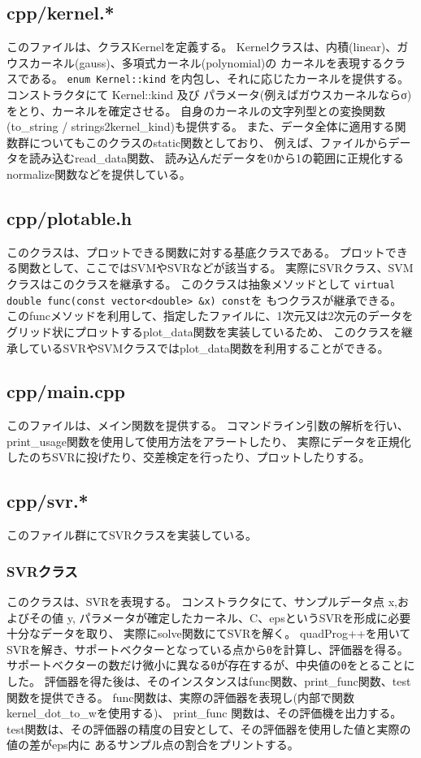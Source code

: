 \documentclass[]{jsarticle}
\begin{document}
\subsection{cpp/kernel.*}
このファイルは、クラスKernelを定義する。
Kernelクラスは、内積(linear)、ガウスカーネル(gauss)、多項式カーネル(polynomial)の
カーネルを表現するクラスである。
\verb|enum Kernel::kind| を内包し、それに応じたカーネルを提供する。
コンストラクタにて Kernel::kind 及び パラメータ(例えばガウスカーネルならσ)をとり、カーネルを確定させる。
自身のカーネルの文字列型との変換関数(to\_string / strings2kernel\_kind)も提供する。
また、データ全体に適用する関数群についてもこのクラスのstatic関数としており、
例えば、ファイルからデータを読み込むread\_data関数、
読み込んだデータを0から1の範囲に正規化するnormalize関数などを提供している。


\subsection{cpp/plotable.h}
このクラスは、プロットできる関数に対する基底クラスである。
プロットできる関数として、ここではSVMやSVRなどが該当する。
実際にSVRクラス、SVMクラスはこのクラスを継承する。
このクラスは抽象メソッドとして
\verb|virtual double func(const vector<double> &x) const|を
もつクラスが継承できる。
このfuncメソッドを利用して、指定したファイルに、1次元又は2次元のデータを
グリッド状にプロットするplot\_data関数を実装しているため、
このクラスを継承しているSVRやSVMクラスではplot\_data関数を利用することができる。

\subsection{cpp/main.cpp}
このファイルは、メイン関数を提供する。
コマンドライン引数の解析を行い、print\_usage関数を使用して使用方法をアラートしたり、
実際にデータを正規化したのちSVRに投げたり、交差検定を行ったり、プロットしたりする。

\subsection{cpp/svr.*}
このファイル群にてSVRクラスを実装している。
\subsubsection{SVRクラス}
このクラスは、SVRを表現する。
コンストラクタにて、サンプルデータ点 x,およびその値 y,
パラメータが確定したカーネル、C、epsというSVRを形成に必要十分なデータを取り、
実際にsolve関数にてSVRを解く。
quadProg++を用いてSVRを解き、サポートベクターとなっている点からθを計算し、評価器を得る。
サポートベクターの数だけ微小に異なるθが存在するが、中央値のθをとることにした。
評価器を得た後は、そのインスタンスはfunc関数、print\_func関数、test関数を提供できる。
func関数は、実際の評価器を表現し(内部で関数kernel\_dot\_to\_wを使用する)、
print\_func 関数は、その評価機を出力する。
test関数は、その評価器の精度の目安として、その評価器を使用した値と実際の値の差がeps内に
あるサンプル点の割合をプリントする。
\end{document}
